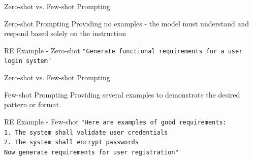 \documentclass{beamer}
\begin{document}
\begin{frame}[t]{Zero-shot vs. Few-shot Prompting}
    \begin{block}{Zero-shot Prompting}
        Providing no examples - the model must understand and respond based solely on the instruction
    \end{block}
    
    \begin{exampleblock}{RE Example - Zero-shot}
        \texttt{"Generate functional requirements for a user login system"}
    \end{exampleblock}
    
\end{frame}

\begin{frame}[t]{Zero-shot vs. Few-shot Prompting}
    \begin{block}{Few-shot Prompting}
        Providing several examples to demonstrate the desired pattern or format
    \end{block}
    
    \begin{exampleblock}{RE Example - Few-shot}
        \texttt{"Here are examples of good requirements: \\1. The system shall validate user credentials\\2. The system shall encrypt passwords\\ Now generate requirements for user registration"}
    \end{exampleblock}
\end{frame}
\end{document}
